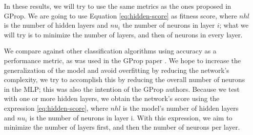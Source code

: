 \documentclass[runningheads]{llncs}
\begin{document}
In these results, we will try to use the same metrics as the ones
proposed in GProp. We are going to use Equation
\ref{eq:hidden-score} as fitness score, where $nhl$ is the number of
hidden layers and $nu_{i}$ the number of neurons in layer $i$; what we
will try is to minimize the number of layers, and then of neurons in
every layer.



We compare against other classification algorithms using accuracy as a
performance metric, as was used in the GProp paper \cite{castilloNC,CastilloNPL}. We hope to
increase the generalization of the model and avoid overfitting by reducing the
network's complexity, we try to accomplish this by reducing the
overall number of neurons in the MLP; this was also the intention of the GProp
authors. Because we test with one or more hidden layers, we obtain the network's
score using the expression \ref{eq:hidden-score}, where $nhl$ is the model's
number of hidden layers and $nu_{i}$ is the number of neurons in layer {i}. With
this expression, we aim to minimize the number of layers first, and then the number of
neurons per layer.

\end{document}
